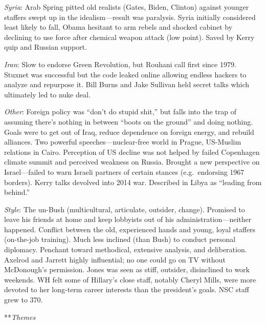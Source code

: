 \documentclass[
]{article}
\begin{document}
\emph{Syria}: Arab Spring pitted old realists (Gates, Biden, Clinton)
against younger staffers swept up in the idealism---result was
paralysis. Syria initially considered least likely to fall, Obama
hesitant to arm rebels and shocked cabinet by declining to use force
after chemical weapon attack (low point). Saved by Kerry quip and
Russian support.

\emph{Iran}: Slow to endorse Green Revolution, but Rouhani call first
since 1979. Stuxnet was successful but the code leaked online allowing
endless hackers to analyze and repurpose it. Bill Burns and Jake
Sullivan held secret talks which ultimately led to nuke deal.

\emph{Other}: Foreign policy was ``don't do stupid shit,'' but falls
into the trap of assuming there's nothing in between ``boots on the
ground'' and doing nothing. Goals were to get out of Iraq, reduce
dependence on foreign energy, and rebuild alliances. Two powerful
speeches---nuclear-free world in Prague, US-Muslim relations in Cairo.
Perception of US decline was not helped by failed Copenhagen climate
summit and perceived weakness on Russia. Brought a new perspective on
Israel---failed to warn Israeli partners of certain stances
(e.g.~endorsing 1967 borders). Kerry talks devolved into 2014 war.
Described in Libya as ``leading from behind.''

\emph{Style}: The un-Bush (multicultural, articulate, outsider, change).
Promised to leave his friends at home and keep lobbyists out of his
administration---neither happened. Conflict between the old, experienced
hands and young, loyal staffers (on-the-job training). Much less
inclined (than Bush) to conduct personal diplomacy. Penchant toward
methodical, extensive analysis, and deliberation. Axelrod and Jarrett
highly influential; no one could go on TV without McDonough's
permission. Jones was seen as stiff, outsider, disinclined to work
weekends. WH felt some of Hillary's close staff, notably Cheryl Mills,
were more devoted to her long-term career interests than the president's
goals. NSC staff grew to 370.

**\emph{Themes}
\end{document}
